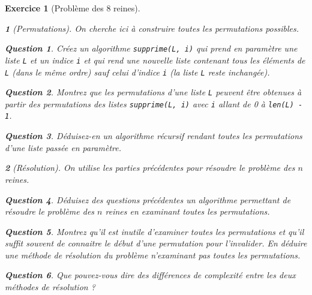 \documentclass{article}
\theoremstyle{exostyle}
\newtheorem{exo}{Exercice}
\theoremstyle{partiestyle}
\newtheorem{partie}{}[exo]
\theoremstyle{questionstyle}
\newtheorem{questionpartie}{Question}[partie]
\begin{document}
\begin{exo}[Problème des 8 reines]
\begin{partie}[Permutations]
On cherche ici à construire toutes les permutations possibles.
\begin{questionpartie}
Créez un algorithme \verb|supprime(L, i)| qui prend en paramètre une liste \verb|L| et un indice \verb|i| et qui rend une nouvelle liste contenant tous les éléments de \verb|L| (dans le même ordre) sauf celui d'indice \verb|i| (la liste \verb+L+ reste inchangée).
\end{questionpartie}

\begin{questionpartie}
Montrez que les permutations d'une liste \verb|L| peuvent être obtenues à partir des permutations des listes \verb|supprime(L, i)| avec \verb|i| allant de 0 à \verb|len(L) - 1|.
\end{questionpartie}

\begin{questionpartie}
Déduisez-en un algorithme récursif rendant toutes les permutations d'une liste passée en paramètre.
\end{questionpartie}
\end{partie}

\begin{partie}[Résolution]
On utilise les parties précédentes pour résoudre le problème des $n$ reines.

\begin{questionpartie}
Déduisez des questions précédentes un algorithme permettant de résoudre le problème des $n$ reines en examinant toutes les permutations.
\end{questionpartie}
\begin{questionpartie}
Montrez qu'il est inutile d'examiner toutes les permutations et qu'il suffit souvent de connaitre le début d'une permutation pour l'invalider. En déduire une méthode de résolution du problème n'examinant pas toutes les permutations.
\end{questionpartie}

\begin{questionpartie}
Que pouvez-vous dire des différences de complexité entre les deux méthodes de résolution ?
\end{questionpartie}

\end{partie}
\end{exo}
\end{document}
